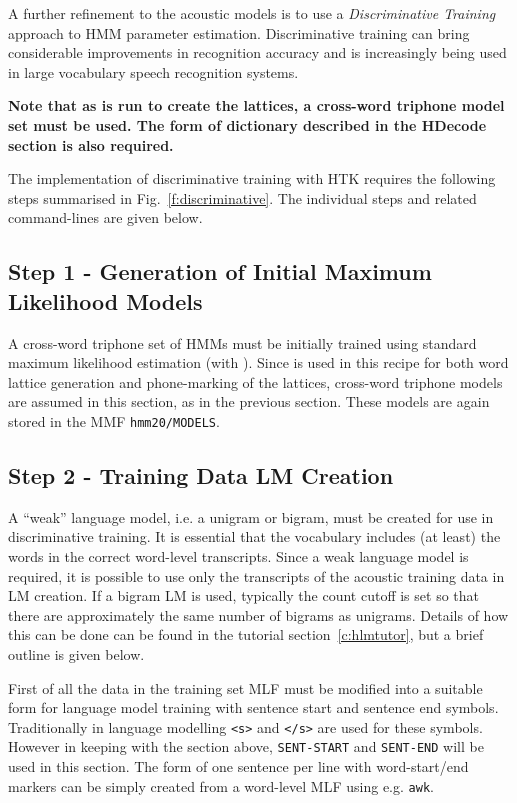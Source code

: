 \newpage
{}

A further refinement to the acoustic models is to use a \textit{Discriminative Training}
approach to HMM parameter estimation. Discriminative training
can bring considerable improvements in recognition accuracy
and is increasingly being used in large vocabulary speech recognition
systems.

{\bf  Note that as  is run to create the lattices, a cross-word
  triphone model set must be used. The form of dictionary described in the
  HDecode section is also required.}


The implementation of discriminative training with HTK requires the following
steps summarised in Fig.~\ref{f:discriminative}. The individual steps and
related command-lines are given below.

\subsection{Step 1 - Generation of Initial Maximum Likelihood Models} 
A cross-word triphone set of HMMs must be initially trained
using standard maximum likelihood estimation (with ). Since
 is used in this recipe for both word lattice generation
and phone-marking of the lattices, cross-word triphone models are assumed in
this section, as in the previous section. These models are again
stored in the MMF \texttt{hmm20/MODELS}.

\subsection{Step 2 - Training Data LM Creation}
A ``weak'' language model, i.e. a unigram or bigram,  must be created for use in discriminative training.
It is essential that the vocabulary includes (at least) the words in the
correct word-level transcripts.  Since a weak language model is required, it
is possible to use only the transcripts of the acoustic training data in LM
creation. If a bigram LM is used, typically the count cutoff is set so that
there are approximately the same number of bigrams as unigrams.  Details of
how this can be done can be found in the  tutorial section~\ref{c:hlmtutor}, but a
brief outline is given below.

First of all the data in the training set MLF must be modified into a suitable
form for language model training with sentence start and sentence end symbols.
Traditionally in language modelling \texttt{<s>} and \texttt{</s>} are used
for these symbols. However in keeping with the  section above,
\texttt{SENT-START} and \texttt{SENT-END} will be used in this section. The form of one
sentence per line with word-start/end markers can be simply created from a
word-level MLF using e.g. \texttt{awk}.

